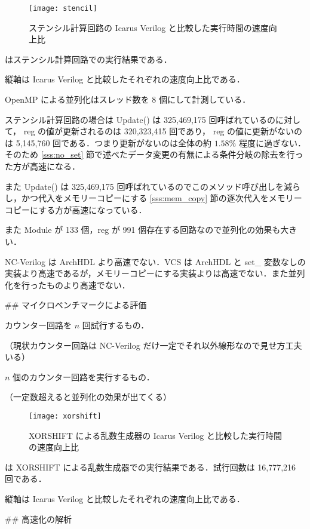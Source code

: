 \begin{figure}[t]
 \centering
 \texttt{[image: stencil]}
 \caption{ステンシル計算回路の Icarus Verilog と比較した実行時間の速度向上比}
 \label{fig:stencil}
\end{figure}

 はステンシル計算回路での実行結果である．

縦軸は Icarus Verilog と比較したそれぞれの速度向上比である．

OpenMP による並列化はスレッド数を 8 個にして計測している．

ステンシル計算回路の場合は Update() は 325,469,175 回呼ばれているのに対して，
reg の値が更新されるのは 320,323,415 回であり，
reg の値に更新がないのは 5,145,760 回である．つまり更新がないのは全体の約
$1.58\%$ 程度に過ぎない．そのため \ref{sss:no_set} 節で述べたデータ変更の有無による条件分岐の除去を行った方が高速になる．

また Update() は 325,469,175 回呼ばれているのでこのメソッド呼び出しを減らし，かつ代入をメモリーコピーにする \ref{sss:mem_copy} 節の逐次代入をメモリーコピーにする方が高速になっている．

また Module が 133 個，reg が 991 個存在する回路なので並列化の効果も大きい．

NC-Verilog は ArchHDL より高速でない．VCS は ArchHDL と set_ 変数なしの実装より高速であるが，メモリーコピーにする実装よりは高速でない．また並列化を行ったものより高速でない．


## マイクロベンチマークによる評価

カウンター回路を $n$ 回試行するもの．

（現状カウンター回路は NC-Verilog だけ一定でそれ以外線形なので見せ方工夫いる）

$n$ 個のカウンター回路を実行するもの．

（一定数超えると並列化の効果が出てくる）


\begin{figure}[t]
 \centering
 \texttt{[image: xorshift]}
 \caption{XORSHIFT による乱数生成器の Icarus Verilog と比較した実行時間の速度向上比}
 \label{fig:xorshift}
\end{figure}

 は XORSHIFT による乱数生成器での実行結果である．試行回数は 16,777,216 回である．

縦軸は Icarus Verilog と比較したそれぞれの速度向上比である．









## 高速化の解析







